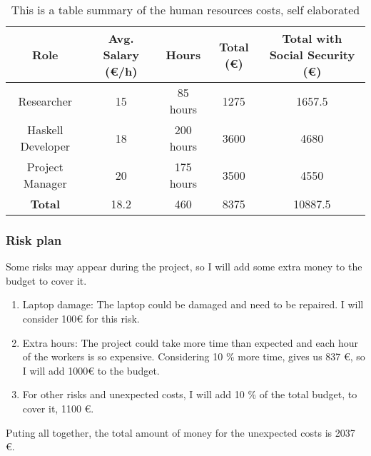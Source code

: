 \begin{table}[H]
    \begin{adjustwidth}{-1in}{-1in} %
    \centering
    \begin{tabular}{|c|c|c|c|c|}
    \hline
    \textbf{Role} & \textbf{Avg. Salary (€/h)} & \textbf{Hours} & \textbf{Total (€)} & \textbf{Total with Social Security (€)} \\ 
    \hline
    Researcher & 15 & 85 hours & 1275 & 1657.5\\
    \hline
    Haskell Developer & 18 & 200 hours & 3600 & 4680\\
    \hline
    Project Manager & 20 & 175 hours & 3500 & 4550\\
    \hline
    \hline
    \textbf{Total} & 18.2 & 460 & 8375 &  10887.5\\
    \hline
    \end{tabular}
    \caption[{[B\&S] Human resources costs}]{This is a table summary of the human resources costs, self elaborated}
    \label{human_resources}
    \end{adjustwidth}
    \end{table}
\subsubsection*{Risk plan}
Some risks may appear during the project, so I will add some extra money to the budget to cover it.
\begin{enumerate}
    \item Laptop damage: The laptop could be damaged and need to be repaired. I will consider 100€ for this risk.
    \item Extra hours: The project could take more time than expected and each hour of the workers is so expensive. Considering 10 \% more time, gives us 837 €, so I will add 1000€ to the budget.
    \item For other risks and unexpected costs, I will add 10 \% of the total budget, to cover it, 1100 €.
\end{enumerate}
Puting all together, the total amount of money for the unexpected costs is 2037 €.
